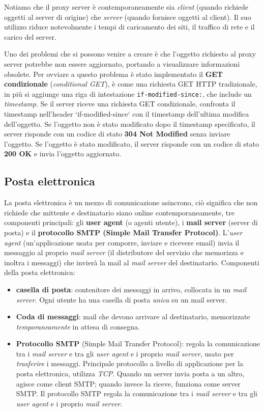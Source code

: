 Notiamo che il proxy server è contemporaneamente sia \textit{client} (quando richiede oggetti al server di origine) che \textit{server} (quando fornisce oggetti al client). Il suo utilizzo riduce notevolmente i tempi di caricamento dei siti, il traffico di rete e il carico del server.

Uno dei problemi che si possono venire a creare è che l'oggetto richiesto al proxy server potrebbe non essere aggiornato, portando a visualizzare informazioni obsolete. Per ovviare a questo problema è stato implementato il \textbf{GET condizionale} (\textit{conditional GET}), è come una richiesta GET HTTP tradizionale, in più si aggiunge una riga di intestazione \texttt{if-modified-since:}, che include un \textit{timestamp}. Se il server riceve una richiesta GET condizionale, confronta il timestamp nell'header `if-modified-since` con il timestamp dell'ultima modifica dell'oggetto. Se l'oggetto non è stato modificato dopo il timestamp specificato, il server risponde con un codice di stato \textbf{304 Not Modified} senza inviare l'oggetto. Se l'oggetto è stato modificato, il server risponde con un codice di stato \textbf{200 OK} e invia l'oggetto aggiornato.

\subsection{Posta elettronica}
La posta elettronica è un mezzo di comunicazione asincrono, ciò significa che non richiede che mittente e destinatario siano online contemporaneamente, tre componenti principali: gli \textbf{user agent} (o agenti utente), i \textbf{mail server} (server di posta) e il \textbf{protocollo SMTP (Simple Mail Transfer Protocol)}.
L'\textit{user agent} (un'applicazione usata per comporre, inviare e ricevere email) invia il messaggio al proprio \textit{mail server} (il distributore del servizio che memorizza e inoltra i messaggi) che invierà la mail al \textit{mail server} del destinatario.
Componenti della posta elettronica:
\begin{itemize}
  \item \textbf{casella di posta}: contenitore dei messaggi in arrivo, collocata in un \textit{mail server}. Ogni utente ha una casella di posta \textit{unica} su un mail server.
  \item \textbf{Coda di messaggi}: mail che devono arrivare al destinatario, memorizzate \textit{temporaneamente} in attesa di consegna.
  \item \textbf{Protocollo SMTP} (Simple Mail Transfer Protocol): regola la comunicazione tra i \textit{mail server} e tra gli \textit{user agent} e i proprio \textit{mail server}, usato per \textit{trasferire} i messaggi. Principale protocollo a livello di applicazione per la posta elettronica, utilizza \textit{TCP}.
    Quando un server invia posta a un altro, agisce come client SMTP; quando invece la riceve, funziona come server SMTP. Il protocollo SMTP regola la comunicazione tra i \textit{mail server} e tra gli \textit{user agent} e i proprio \textit{mail server}.
\end{itemize}

